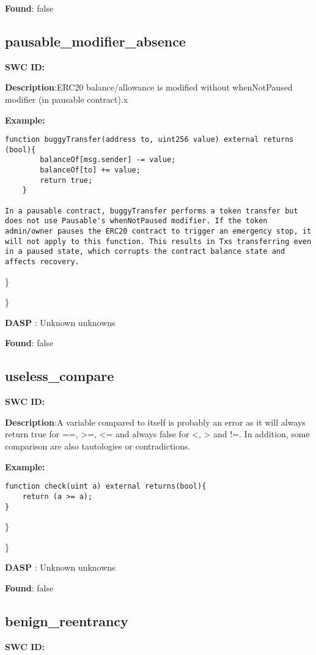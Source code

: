\documentclass{article}
\begin{document}
\textbf{Found}: false

\subsection{pausable\_modifier\_absence} 
\textbf{SWC \textunderscore ID:} 

\textbf{Description}:ERC20 balance/allowance is modified without whenNotPaused modifier (in pausable contract).x


\textbf{Example:} 
\begin{verbatim}
function buggyTransfer(address to, uint256 value) external returns (bool){
        balanceOf[msg.sender] -= value;
        balanceOf[to] += value;
        return true;
    }

In a pausable contract, buggyTransfer performs a token transfer but does not use Pausable's whenNotPaused modifier. If the token admin/owner pauses the ERC20 contract to trigger an emergency stop, it will not apply to this function. This results in Txs transferring even in a paused state, which corrupts the contract balance state and affects recovery.

\end{verbatim}\} 

\} 

\textbf{DASP} : Unknown unknowns

\textbf{Found}: false

\subsection{useless\_compare} 
\textbf{SWC \textunderscore ID:} 

\textbf{Description}:A variable compared to itself is probably an error as it will always return true for ==, >=, <= and always false for <, > and !=. In addition, some comparison are also tautologies or contradictions.


\textbf{Example:} 
\begin{verbatim}
function check(uint a) external returns(bool){
    return (a >= a);
}

\end{verbatim}\} 

\} 

\textbf{DASP} : Unknown unknowns

\textbf{Found}: false

\subsection{benign\_reentrancy} 
\textbf{SWC \textunderscore ID:} 
\end{document}
